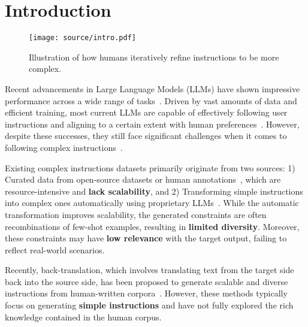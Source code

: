 \section{Introduction}

\begin{figure}[t]
    \centering
    \texttt{[image: source/intro.pdf]}
    \caption{Illustration of how humans iteratively refine instructions to be more complex.}
    \label{fig: intro}
    \vspace{-1mm}
\end{figure}

Recent advancements in Large Language Models (LLMs) have shown impressive performance across a wide range of tasks~\cite{zhao2023survey, li2024graphreader, he2024chinesesimpleqa}. Driven by vast amounts of data and efficient training, most current LLMs are capable of effectively following user instructions and aligning to a certain extent with human preferences~\cite{ouyang2022training,li20242d,huang2025musc}.
However, despite these successes, they still face significant challenges when it comes to following complex instructions~\cite{jiang2023followbench,wen2024benchmarking}.

Existing complex instructions datasets primarily originate from two sources: 1) Curated data from open-source datasets or human annotations~\cite{zhou2024lima,zhang2024cfbench}, which are resource-intensive and \textbf{lack scalability}, and 2) Transforming simple instructions into complex ones automatically using proprietary LLMs~\cite{xu2023wizardlm,sun2024conifer}. 
While the automatic transformation improves scalability, the generated constraints are often recombinations of few-shot examples, resulting in \textbf{limited diversity}.
Moreover, these constraints may have \textbf{low relevance} with the target output, failing to reflect real-world scenarios.



Recently, back-translation, which involves translating text from the target side back into the source side, has been proposed to generate scalable and diverse instructions from human-written corpora~\cite{sennrich2015improving,hoang2018iterative,zheng2024kun,li2023self}. 
However, these methods typically focus on generating \textbf{simple instructions} and have not fully explored the rich knowledge contained in the human corpus.

